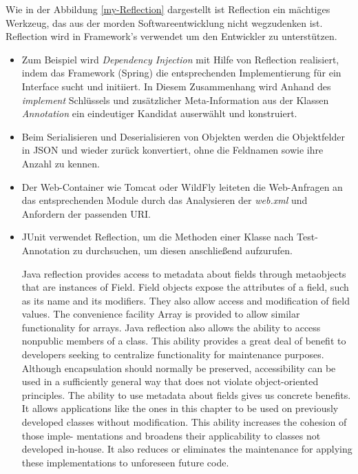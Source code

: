 Wie in der Abbildung \ref{my-Reflection} dargestellt ist Reflection ein mächtiges Werkzeug, das aus der morden Softwareentwicklung nicht wegzudenken ist. Reflection wird in Framework's verwendet um den Entwickler zu unterstützen. 
\begin{itemize}
  \item Zum Beispiel wird \textit{Dependency Injection} mit Hilfe von Reflection realisiert, indem das Framework (Spring) die entsprechenden Implementierung für ein Interface sucht und initiiert. In Diesem Zusammenhang wird Anhand des \textit{implement} Schlüssels und zusätzlicher Meta-Information aus der Klassen \textit{Annotation} ein eindeutiger Kandidat auserwählt und konstruiert.
  \item Beim Serialisieren und Deserialisieren von Objekten werden die Objektfelder in JSON und wieder zurück konvertiert, ohne die Feldnamen sowie ihre Anzahl zu kennen.
  \item Der Web-Container wie Tomcat oder WildFly leiteten die Web-Anfragen an das entsprechenden Module durch das Analysieren der \textit{web.xml} und Anfordern der passenden URI.
  \item JUnit verwendet Reflection, um die Methoden einer Klasse nach Test-Annotation zu durchsuchen, um diesen anschließend aufzurufen.






 Java reflection provides access to metadata about fields through metaobjects that are instances of Field. Field objects expose the attributes of a field, such as its name and its modifiers. They also allow access and modification of field values. The convenience facility Array is provided to allow similar functionality for arrays.
Java reflection also allows the ability to access nonpublic members of a class. This ability provides a great deal of benefit to developers seeking to centralize functionality for maintenance purposes. Although encapsulation should normally be preserved, accessibility can be used in a sufficiently general way that does not violate object-oriented principles.
The ability to use metadata about fields gives us concrete benefits. It allows applications like the ones in this chapter to be used on previously developed classes without modification. This ability increases the cohesion of those imple- mentations and broadens their applicability to classes not developed in-house. It also reduces or eliminates the maintenance for applying these implementations to unforeseen future code.


\end{itemize}
